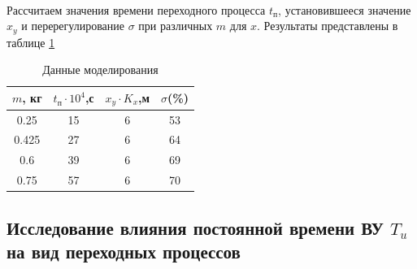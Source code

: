 \documentclass[a4paper,12pt]{article}
\renewcommand{\arraystretch}{1.5}
\begin{document}
	\paragraph{}Рассчитаем значения времени переходного процесса $t_\text{п}$, установившееся значение $x_y$ и перерегулирование $\sigma$ при различных $m$ для $x$. Результаты представлены в таблице \ref{t_2}
	\begin{table}[h]
		\centering
		\caption{Данные моделирования}
		\renewcommand{\arraystretch}{2} 
		\renewcommand{\tabcolsep}{1.6cm}
		\begin{center}
			\begin{tabular}{|c|c|c|c|}
				\hline
				$m$, кг & $t_\text{п} \cdot 10^4$,с & $x_y\cdot K_x$,м & $\sigma$(\%)  \\ \hline
				0.25 & 15 & 6 & 53 \\ \hline
				0.425 & 27 & 6 & 64 \\ \hline
				0.6 & 39 & 6 & 69 \\ \hline
				0.75 & 57 & 6 & 70 \\ \hline
				
			\end{tabular}
		\end{center}
		\label{t_2}
	\end{table}
	\newpage
	\begin{center}
	\section{Исследование влияния постоянной времени ВУ $T_u$ на вид переходных процессов}
	\end{center}
	
\end{document}
